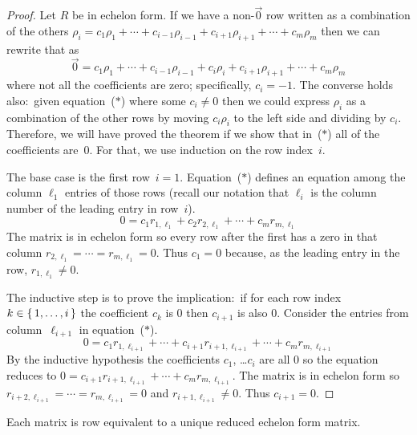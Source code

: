 \begin{proof}
Let $R$ be in echelon form.
If we have a non-\( \vec{0} \) row written as a combination
of the others
$\rho_i=c_1\rho_1+\cdots+c_{i-1}\rho_{i-1}+
               c_{i+1}\rho_{i+1}+\cdots+c_m\rho_m$
then we can rewrite that as
\begin{equation*}
   \vec{0}=c_1\rho_1+\cdots+c_{i-1}\rho_{i-1}+c_i\rho_i+
               c_{i+1}\rho_{i+1}+\cdots+c_m\rho_m
  \tag{$*$}
\end{equation*}
where not all the coefficients are zero; specifically, $c_i=-1$.
The converse holds also:~given equation~($*$) where some $c_i\neq 0$ then we 
could express $\rho_i$ as a combination of the other rows by 
moving $c_i\rho_i$ to the left side and dividing by $c_i$.
Therefore, we will have proved the theorem if we
show that in~($*$) all of the coefficients are~$0$.
For that, we use induction on the row index~$i$.

The base case is the first row~$i=1$.
Equation~($*$) defines an equation among the column $\ell_1$ entries of those 
rows
(recall our notation that $\ell_i$ is the column number of 
the leading entry in row~$i$).
\begin{equation*}
  0=c_1r_{1,\ell_1}+c_2r_{2,\ell_1}+\cdots+c_mr_{m,\ell_1}
\end{equation*}
The matrix is in echelon form so
every row after the first has a zero in that column 
$r_{2,\ell_1}=\cdots=r_{m,\ell_1}=0$.
Thus $c_1=0$ because, as the leading entry
in the row, $r_{1,\ell_1}\neq 0$.

The inductive step is to prove the implication:~if 
for each row index $k\in\mbox{$\{\,1,\ldots,i\,\}$}$ the coefficient $c_k$ is $0$
then $c_{i+1}$ is also $0$. 
Consider the entries from column~$\ell_{i+1}$ in equation~($*$). 
\begin{equation*}
  0=c_1r_{1,\ell_{i+1}}+\cdots+c_{i+1}r_{i+1,\ell_{i+1}}+\cdots+c_mr_{m,\ell_{i+1}}
\end{equation*}
By the inductive hypothesis the coefficients $c_1$, \ldots $c_i$ are
all $0$ so the equation reduces to 
$0=c_{i+1}r_{i+1,\ell_{i+1}}+\cdots+c_mr_{m,\ell_{i+1}}$.
The matrix is in echelon form
so $r_{i+2,\ell_{i+1}}=\cdots=r_{m,\ell_{i+1}}=0$ and $r_{i+1,\ell_{i+1}}\neq 0$.
Thus $c_{i+1}=0$.
\end{proof}

\begin{theorem}
\label{th:ReducedEchelonFormIsUnique}
Each matrix is row equivalent to a unique reduced echelon form matrix.
\end{theorem}

